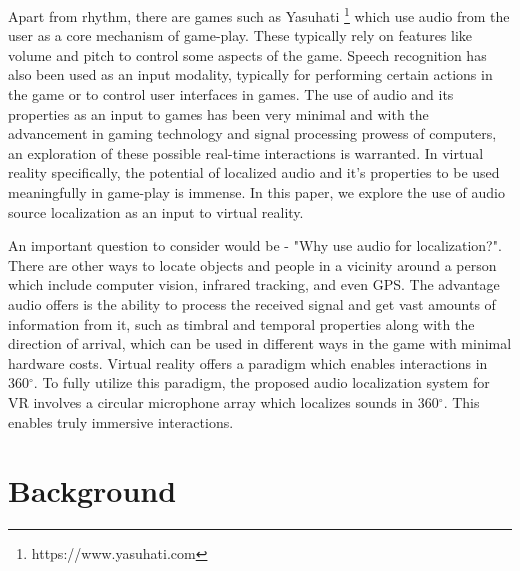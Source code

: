\documentclass[convention]{aesconf}
\begin{document}
Apart from rhythm, there are games such as Yasuhati \footnote{https://www.yasuhati.com} which use audio from the user as a core mechanism of game-play. These typically rely on features like volume and pitch to control some aspects of the game. Speech recognition has also been used as an input modality, typically for performing certain actions in the game or to control user interfaces in games.
The use of audio and its properties as an input to games has been very minimal and with the advancement in gaming technology and signal processing prowess of computers, an exploration of these possible real-time interactions is warranted. In virtual reality specifically, the potential of localized audio and it's properties to be used meaningfully in game-play is immense. In this paper, we explore the use of audio source localization as an input to virtual reality.

An important question to consider would be - "Why use audio for localization?". There are other ways to locate objects and people in a vicinity around a person which include computer vision, infrared tracking, and even GPS. The advantage audio offers is the ability to process the received signal and get vast amounts of information from it, such as timbral and temporal properties along with the direction of arrival, which can be used in different ways in the game with minimal hardware costs.
Virtual reality offers a paradigm which enables interactions in 360$^\circ$. To fully utilize this paradigm, the proposed audio localization system for VR involves a circular microphone array which localizes sounds in 360$^\circ$. This enables truly immersive interactions.

\section{Background}
\end{document}
